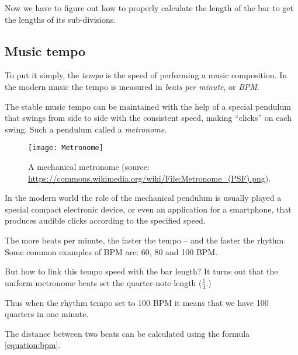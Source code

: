 \documentclass[../sparc.tex]{subfiles}
\begin{document}
Now we have to figure out how to properly calculate the length of the bar to get
the lengths of its sub-divisions.

\subsection{Music tempo}

To put it simply, the \emph{tempo} is the speed of performing a music
composition.  In the modern music the tempo is measured in \emph{beats per
minute}, or \emph{BPM}.

The stable music tempo can be maintained with the help of a special pendulum
that swings from side to side with the consistent speed, making ``clicks'' on
each swing.  Such a pendulum called a \emph{metronome}.

\begin{figure}[h]
  \centering
  \texttt{[image: Metronome]}
  \caption{A mechanical metronome (source:
    \url{https://commons.wikimedia.org/wiki/File:Metronome_(PSF).png}).}
  \label{fig:sound-metronome}
\end{figure}

In the modern world the role of the mechanical pendulum is usually played a
special compact electronic device, or even an application for a smartphone, that
produces audible clicks according to the specified speed.

The more beats per minute, the faster the tempo -- and the faster the rhythm.
Some common examples of \gls{BPM} are: 60, 80 and 100 BPM.

But how to link this tempo speed with the bar length?  It turns out that the
uniform metronome beats set the quarter-note length ($\frac{1}{4}$.)

Thus when the rhythm tempo set to 100 BPM it means that we have 100 quarters in
one minute.


The distance between two beats can be calculated using the formula
\ref{equation:bpm}.
\end{document}
